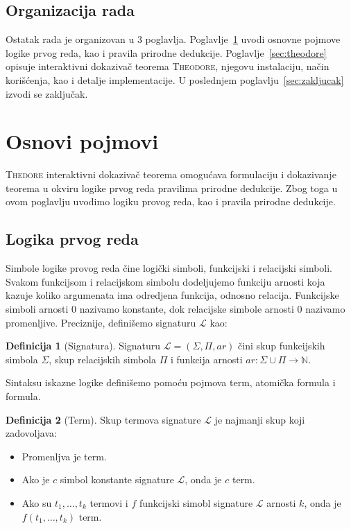 \documentclass[a4paper,10pt]{article}
\theoremstyle{definition}
\newtheorem{definition}{Definicija}[section]
\begin{document}
\subsection{Organizacija rada}
\label{sub:organizacija}

Ostatak rada je organizovan u 3 poglavlja. Poglavlje~\ref{sec:osnove} uvodi osnovne pojmove logike prvog reda, kao i pravila prirodne dedukcije. Poglavlje~\ref{sec:theodore} opisuje interaktivni dokazivač teorema \textsc{Theodore}, njegovu instalaciju, način korišćenja, kao i detalje implementacije. U poslednjem poglavlju~\ref{sec:zakljucak} izvodi se zaključak.

\section{Osnovi pojmovi}
\label{sec:osnove}

\textsc{Thedore} interaktivni dokazivač teorema omogućava formulaciju i dokazivanje teorema u okviru logike prvog reda pravilima prirodne dedukcije. Zbog toga u ovom poglavlju uvodimo logiku provog reda, kao i pravila prirodne dedukcije.

\subsection{Logika prvog reda}
\label{sub:fol}

Simbole logike provog reda čine logički simboli, funkcijski i relacijski simboli. Svakom funkcijsom i relacijskom simbolu dodeljujemo funkciju arnosti koja kazuje koliko argumenata ima odredjena funkcija, odnosno relacija. Funkcijske simboli arnosti $0$ nazivamo konstante, dok relacijske simbole arnosti $0$ nazivamo promenljive. Preciznije, definišemo signaturu $\mathcal{L}$ kao:

\begin{definition}[Signatura]
    Signaturu $\mathcal{L} = (\Sigma, \Pi, ar)$ čini skup funkcijskih simbola $\Sigma$, skup relacijskih simbola $\Pi$ i funkcija arnosti $ar : \Sigma \cup \Pi \to \mathbb{N}$.
\end{definition}

Sintaksu iskazne logike definišemo pomoću pojmova term, atomička formula i formula.

\begin{definition}[Term]
    Skup termova signature $\mathcal{L}$ je najmanji skup koji zadovoljava:
    \begin{itemize}
        \item{Promenljva je term.}
        \item{Ako je $c$ simbol konstante signature $\mathcal{L}$, onda je $c$ term.}
        \item{Ako su $t_1, \ldots, t_k$ termovi i $f$ funkcijski simobl signature $\mathcal{L}$ arnosti $k$, onda je $f(t_1, \ldots, t_k)$ term.}
    \end{itemize}
\end{definition}
\end{document}

